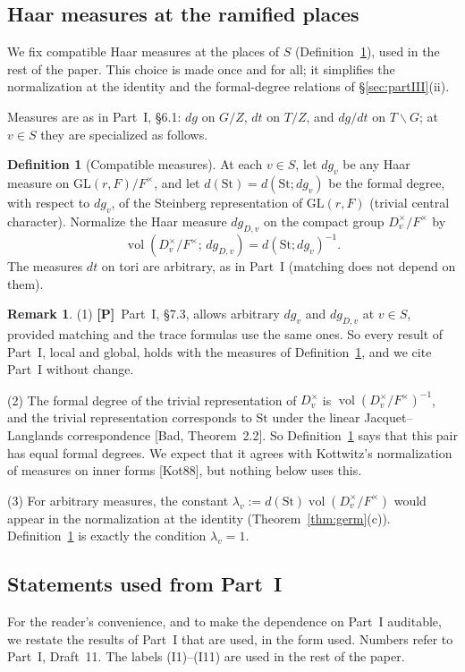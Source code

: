 \documentclass[12pt]{article}
\newcommand{\vol}{\operatorname{vol}}
\newcommand{\GL}{\mathrm{GL}}
\newcommand{\St}{\mathrm{St}}
\newcommand{\Pv}{\textbf{[P]}}
\theoremstyle{plain}
\theoremstyle{definition}
\newtheorem{definition}[theorem]{Definition}
\newtheorem{remark}[theorem]{Remark}
\begin{document}
\subsection{Haar measures at the ramified places}\label{subsec:measures}
We fix compatible Haar measures at the places of $S$ (Definition~\ref{def:measures}), used in the rest of the paper. This choice is made once and for all; it simplifies the normalization at the identity and the formal-degree relations of \S\ref{sec:partIII}(ii).

Measures are as in Part~I, \S6.1: $dg$ on $G/Z$, $dt$ on $T/Z$, and $dg/dt$ on $T\backslash G$; at $v\in S$ they are specialized as follows.

\begin{definition}[Compatible measures]\label{def:measures}
At each $v\in S$, let $dg_v$ be any Haar measure on $\GL(r,F)/F^\times$, and let $d(\St)=d(\St;dg_v)$ be the formal degree, with respect to $dg_v$, of the Steinberg representation of $\GL(r,F)$ (trivial central character). Normalize the Haar measure $dg_{D,v}$ on the compact group $D_v^\times/F^\times$ by
\[ \vol(D_v^\times/F^\times;\,dg_{D,v})=d(\St;dg_v)^{-1}. \]
The measures $dt$ on tori are arbitrary, as in Part~I (matching does not depend on them).
\end{definition}

\begin{remark}\label{rem:measures}
(1) \Pv\ Part~I, \S7.3, allows arbitrary $dg_v$ and $dg_{D,v}$ at $v\in S$, provided matching and the trace formulas use the same ones. So every result of Part~I, local and global, holds with the measures of Definition~\ref{def:measures}, and we cite Part~I without change.

(2) The formal degree of the trivial representation of $D_v^\times$ is $\vol(D_v^\times/F^\times)^{-1}$, and the trivial representation corresponds to $\St$ under the linear Jacquet--Langlands correspondence [Bad, Theorem~2.2]. So Definition~\ref{def:measures} says that this pair has equal formal degrees. We expect that it agrees with Kottwitz's normalization of measures on inner forms [Kot88], but nothing below uses this.

(3) For arbitrary measures, the constant $\lambda_v:=d(\St)\vol(D_v^\times/F^\times)$ would appear in the normalization at the identity (Theorem~\ref{thm:germ}(c)). Definition~\ref{def:measures} is exactly the condition $\lambda_v=1$.
\end{remark}

\subsection{Statements used from Part~I}\label{subsec:fromPartI}
For the reader's convenience, and to make the dependence on Part~I auditable, we restate the results of Part~I that are used, in the form used. Numbers refer to Part~I, Draft~11. The labels (I1)--(I11) are used in the rest of the paper.
\end{document}
